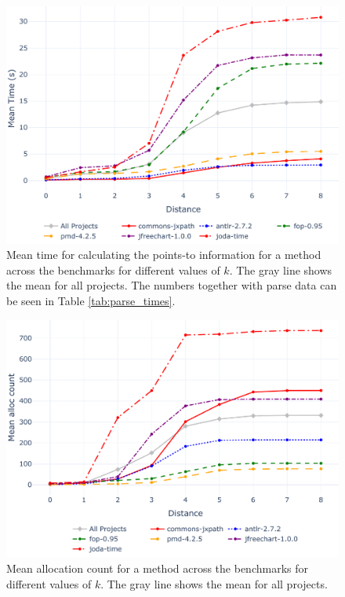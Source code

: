 \begin{figure}[htbp]
\centering
\includegraphics[width=\FigureWidth]{figures/mean_time_evaluation.pdf}
\caption{Mean time for calculating the points-to information for a method across the benchmarks for different values of $k$. The gray line shows the mean for all projects. The numbers together with parse data can be seen in Table \ref{tab:parse_times}.}
\label{fig:mean_time}
\end{figure}

\begin{figure}[htbp]
\centering
\includegraphics[width=\FigureWidth]{figures/alloc_count_evaluation.pdf}
\caption{Mean allocation count for a method across the benchmarks for different values of $k$. The gray line shows the mean for all projects.}
\label{fig:alloc_count}
\end{figure}

